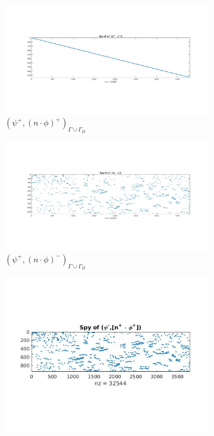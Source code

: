 \documentclass[a4paper,twoside,openright]{book}
\begin{document}
\begin{figure}
  \begin{subfigure}{0.5\textwidth}
    \includegraphics[width=\linewidth]{figure41.jpg}
  \caption{$( \psi^+ ,(n \cdot \phi)^+)_{\Gamma \cup \Gamma_D}$}
  \label{fig:figure41}
  \end{subfigure}
  \begin{subfigure}{0.5\textwidth}
    \includegraphics[width=\linewidth]{figure42.jpg}
  \caption{$( \psi^+ ,(n \cdot \phi)^-)_{\Gamma \cup \Gamma_D}$}
  \label{fig:figure42}
  \end{subfigure}
    \begin{subfigure}{0.5\textwidth}
    \includegraphics[width=\linewidth]{figure43.jpg}

\end{subfigure}
\end{figure}
\end{document}
